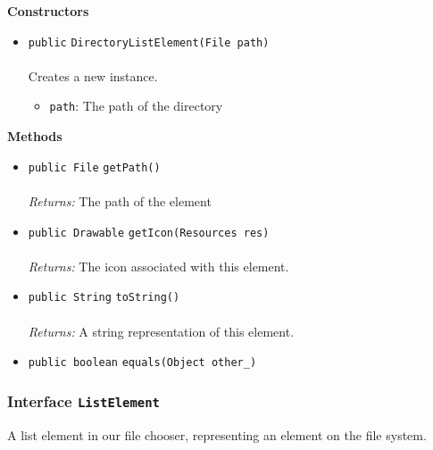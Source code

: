 \textbf{\sffamily Constructors}
\begin{itemize}
\item \lstinline|public| \lstinline|DirectoryListElement|\lstinline|(File path)|\\ \\[-0.6em]
Creates a new instance.
\begin{itemize}
\item \lstinline|path|: The path of the directory
\end{itemize}



\end{itemize}


\textbf{\sffamily Methods}
\begin{itemize}
\item \lstinline|public File| \lstinline|getPath|\lstinline|()|\\ \\[-0.6em]
\emph{Returns:} The path of the element



\item \lstinline|public Drawable| \lstinline|getIcon|\lstinline|(Resources res)|\\ \\[-0.6em]
\emph{Returns:} The icon associated with this element.



\item \lstinline|public String| \lstinline|toString|\lstinline|()|\\ \\[-0.6em]
\emph{Returns:} A string representation of this element.



\item \lstinline|public boolean| \lstinline|equals|\lstinline|(Object other_)| \\[-0.6em]




\end{itemize}

\subsubsection{Interface \lstinline|ListElement|}
A list element in our file chooser, representing an element on the file system. \\
\noindent\begin{minipage}[t]{5cm}
\vspace{0.3em}
\hspace*{2em}
\vspace{0.3em}
\end{minipage}





